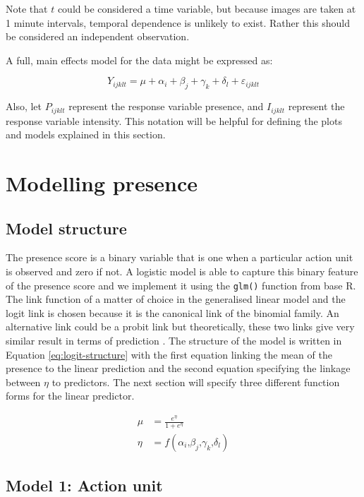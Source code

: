 \documentclass{monashthesis}
\begin{document}
Note that \(t\) could be considered a time variable, but because images are taken at 1 minute intervals, temporal dependence is unlikely to exist. Rather this should be considered an independent observation.

A full, main effects model for the data might be expressed as:

\[Y_{ijklt} = \mu + \alpha_i + \beta_j + \gamma_k + \delta_l + \varepsilon_{ijklt}\]

\noindent Also, let \(P_{ijklt}\) represent the response variable presence, and \(I_{ijklt}\) represent the response variable intensity. This notation will be helpful for defining the plots and models explained in this section.

\hypertarget{modelling-presence}{%
\section{Modelling presence}\label{modelling-presence}}

\hypertarget{model-structure}{%
\subsection{Model structure}\label{model-structure}}

The presence score is a binary variable that is one when a particular action unit is observed and zero if not. A logistic model is able to capture this binary feature of the presence score and we implement it using the \texttt{glm()} function from base R. The link function of a matter of choice in the generalised linear model and the logit link is chosen because it is the canonical link of the binomial family. An alternative link could be a probit link but theoretically, these two links give very similar result in terms of prediction \autocite{faraway2016extending}. The structure of the model is written in Equation \ref{eq:logit-structure} with the first equation linking the mean of the presence to the linear prediction and the second equation specifying the linkage between \(\eta\) to predictors. The next section will specify three different function forms for the linear predictor.

\begin{align}
\mu &= \frac{e^{\eta}}{1 + e^{\eta}} \\
\eta &= f(\alpha_i\text{,}\beta_j\text{,}\gamma_k\text{,}\delta_l) \label{eq:logit-structure}
\end{align}

\hypertarget{model-1-action-unit}{%
\subsection{Model 1: Action unit}\label{model-1-action-unit}}
\end{document}
